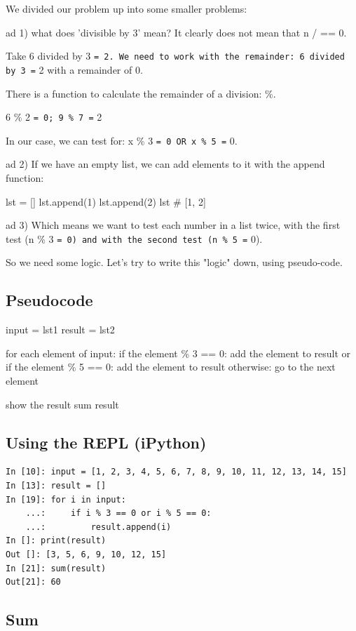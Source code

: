 \documentclass[11pt]{article}
\begin{document}
We divided our problem up into some smaller problems:

ad 1) what does 'divisible by 3' mean? It clearly does not mean that n /
   == 0.

Take 6 divided by 3 \texttt{= 2. We need to work with the remainder: 6
divided by 3 =} 2 with a remainder of 0.

There is a function to calculate the remainder of a division: \%.

6 \% 2 \texttt{= 0; 9 \% 7 =} 2

In our case, we can test for: x \% 3 \texttt{= 0 OR x \% 5 =} 0.

ad 2) If we have an empty list, we can add elements to it with the append
   function:

lst = []
lst.append(1)
lst.append(2)
lst \# [1, 2]

ad 3) Which means we want to test each number in a list twice, with the
   first test (n \% 3 \texttt{= 0) and with the second test (n \% 5 =} 0).

So we need some logic. Let's try to write this "logic" down, using pseudo-code.

\subsection*{Pseudocode}
\label{sec-1-3}

input = lst1
result = lst2

for each element of input:
    if the element \% 3 == 0:
        add the element to result
    or if the element \% 5 == 0:
        add the element to result
    otherwise: go to the next element

show the result
sum result

\subsection*{Using the REPL (iPython)}
\label{sec-1-4}

\begin{verbatim}
In [10]: input = [1, 2, 3, 4, 5, 6, 7, 8, 9, 10, 11, 12, 13, 14, 15]
In [13]: result = []
In [19]: for i in input: 
    ...:     if i % 3 == 0 or i % 5 == 0: 
    ...:         result.append(i)
In []: print(result)
Out []: [3, 5, 6, 9, 10, 12, 15]
In [21]: sum(result)                                                            
Out[21]: 60
\end{verbatim}

\subsection*{Sum}
\label{sec-1-5}
\end{document}
